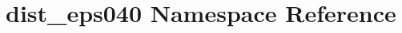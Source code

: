 \hypertarget{namespacedist__eps040}{}\section{dist\+\_\+eps040 Namespace Reference}
\label{namespacedist__eps040}
